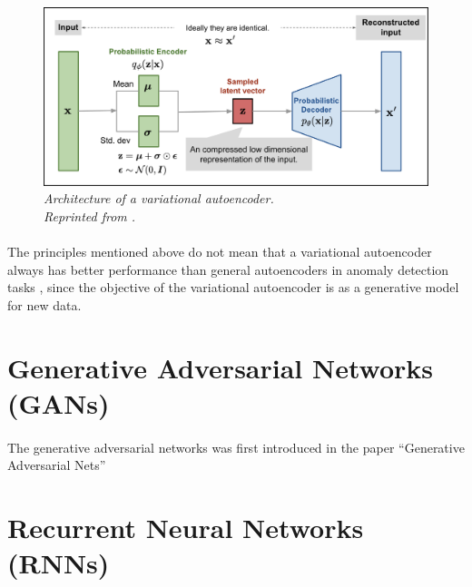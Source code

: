 \begin{figure}[H]
  \centering
  \caption[Architecture of a variational autoencoder.]{\emph{Architecture of a variational autoencoder. \\
  Reprinted from \citeauthor{weng_2018} \citeyear{weng_2018}.}}\label{fig:VAE}
  \includegraphics[scale = 0.15]{figures/VAE.jpg}  
\end{figure}

\paragraph{}
The principles mentioned above do not mean that a variational autoencoder always has better performance than general autoencoders in anomaly detection tasks \cite{agmon_2021}, since the objective of the variational autoencoder is as a generative model for new data.

\section{Generative Adversarial Networks (GANs)}
\paragraph{}
The generative adversarial networks was first introduced in the paper ``Generative Adversarial Nets'' \cite{goodfellow_pouget_abadie_mirza_xu_warde_farley_ozair_courville_bengio_2014}



\section{Recurrent Neural Networks (RNNs)}
